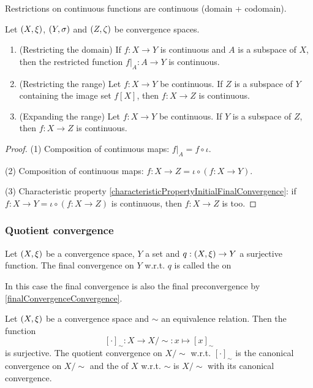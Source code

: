 \begin{lemma}
Restrictions on continuous functions are continuous (domain + codomain).
\end{lemma}

\begin{proposition} \label{continuityRestrictionExpansion}
Let $\left( X,\xi \right)$, $\left( Y,\sigma \right)$ and $\left( Z,\zeta \right)$ be convergence spaces.
\begin{enumerate}
\item \textup{(Restricting the domain)} If $f:X\to Y$ is continuous and $A$ is a subspace of $X$, then the restricted function $f|_{A}:A\to Y$ is continuous.
\item \textup{(Restricting the range)} Let $f:X\to Y$ be continuous. If $Z$ is a subspace of $Y$ containing the image set $f[X]$, then $f:X\to Z$ is continuous.
\item \textup{(Expanding the range)} Let $f:X\to Y$ be continuous. If $Y$ is a subspace of $Z$, then $f:X\to Z$ is continuous.
\end{enumerate}
\end{proposition}
\begin{proof}
(1) Composition of continuous maps: $f|_{A} = f\circ\iota$.

(2) Composition of continuous maps: $f:X\to Z = \iota \circ (f: X\to Y)$.

(3) Characteristic property \ref{characteristicPropertyInitialFinalConvergence}: if $f:X\to Y = \iota \circ (f:X\to Z)$ is continuous, then $f:X\to Z$ is too.
\end{proof}

\subsubsection{Quotient convergence}
\begin{definition}
Let $\left( X,\xi \right)$ be a convergence space, $Y$ a set and $q: \left( X,\xi \right)\to Y$ a surjective function. The final convergence on $Y$ w.r.t. $q$ is called the  on 
\end{definition}

In this case the final convergence is also the final preconvergence by \ref{finalConvergenceConvergence}.

\begin{example}
Let $\left( X,\xi \right)$ be a convergence space and $\sim$ an equivalence relation. Then the function
\[ [\cdot]_\sim: X\to X/{\sim}: x\mapsto [x]_\sim \]
is surjective. The quotient convergence on $X/{\sim}$ w.r.t. $[\cdot]_\sim$ is the canonical convergence on $X/{\sim}$ and the  of $X$ w.r.t. $\sim$ is $X/{\sim}$ with its canonical convergence.
\end{example}

